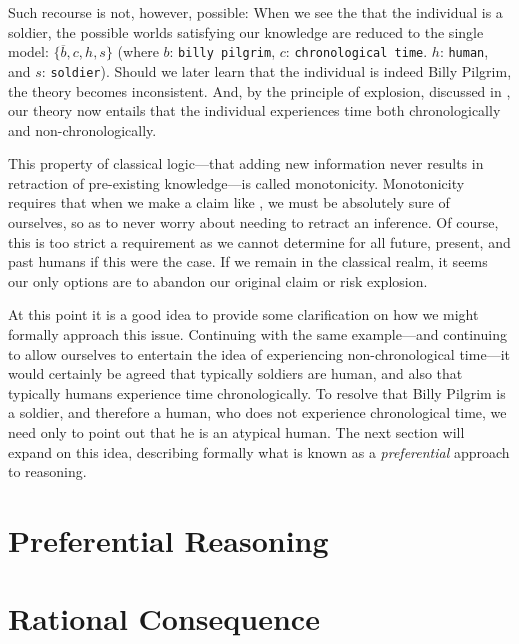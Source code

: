 Such recourse is not, however, possible: When we see the that the individual is a soldier, the possible worlds satisfying our knowledge are reduced to the single model: $\{\overline{b},c,h,s\}$ (where $b$: \texttt{billy pilgrim}, $c$: \texttt{chronological time}. $h$: \texttt{human}, and $s$: \texttt{soldier}). Should we later learn that the individual is indeed Billy Pilgrim, the theory becomes inconsistent.
And, by the principle of explosion, discussed in , our theory now entails that the individual experiences time both chronologically and non-chronologically.

This property of classical logic---that adding new information never results in retraction of pre-existing knowledge---is called monotonicity. Monotonicity requires that when we make a claim like , we must be absolutely sure of ourselves, so as to never worry about needing to retract an inference. Of course, this is too strict a requirement as we cannot determine for all future, present, and past humans if this were the case. If we remain in the classical realm, it seems our only options are to abandon our original claim or risk explosion.

At this point it is a good idea to provide some clarification on how we might formally approach this issue. Continuing with the same example---and continuing to allow ourselves to entertain the idea of experiencing non-chronological time---it would certainly be agreed that typically soldiers are human, and also that typically humans experience time chronologically. To resolve that Billy Pilgrim is a soldier, and therefore a human, who does not experience chronological time, we need only to point out that he is an atypical human. The next section will expand on this idea, describing formally what is known as a \textit{preferential} approach to reasoning.

\section{Preferential Reasoning}
\label{section:preferential-reasoning}



\section{Rational Consequence}
